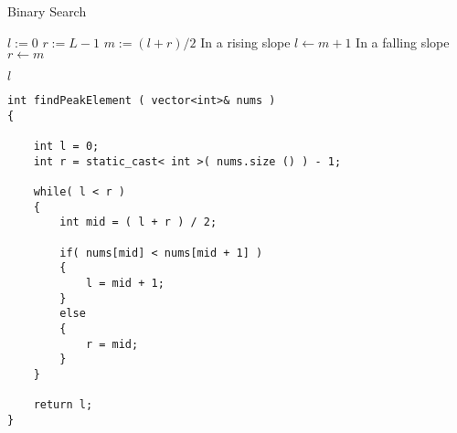 \setcounter{algorithm}{0}
\setcounter{algorithm}{0}
\begin{algorithm}[H]
\caption{Binary Search}
\begin{algorithmic}[1]
\State $l:=0$
\State $r:=L-1$
\State $m:=(l+r)/2$
 \Comment In a rising slope
\State $l\gets m+1$
\Else \Comment In a falling slope
\State $r\gets m$ 
\EndIf
{}
\end{algorithmic}
\end{algorithm}
\begin{algorithm}[H]
\begin{algorithmic}[1]
\EndWhile
\State \Return $l$
\EndProcedure
\end{algorithmic}
\end{algorithm}
\setcounter{lstlisting}{0}
\begin{lstlisting}[style=customc, caption={Reference Code}]
int findPeakElement ( vector<int>& nums )
{

	int l = 0;
	int r = static_cast< int >( nums.size () ) - 1;

	while( l < r )
	{
		int mid = ( l + r ) / 2;

		if( nums[mid] < nums[mid + 1] )
		{
			l = mid + 1;
		}
		else
		{
			r = mid;
		}
	}

	return l;
}
\end{lstlisting}